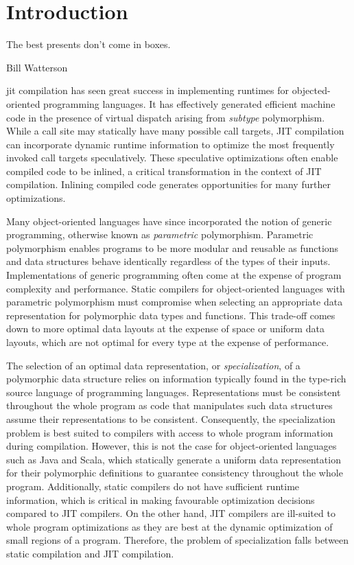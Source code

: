 \chapter{Introduction}

\epigraph{The best presents don't come in boxes.}{Bill Watterson}

\acrfull{jit} compilation has seen great success in implementing runtimes for objected-oriented programming languages.
It has effectively generated efficient machine code in the presence of virtual dispatch arising from \textit{subtype} polymorphism.
While a call site may statically have many possible call targets, JIT compilation can incorporate dynamic runtime information to optimize the most frequently invoked call targets speculatively.
These speculative optimizations often enable compiled code to be inlined, a critical transformation in the context of JIT compilation.
Inlining compiled code generates opportunities for many further optimizations.

Many object-oriented languages have since incorporated the notion of generic programming, otherwise known as \textit{parametric} polymorphism.
Parametric polymorphism enables programs to be more modular and reusable as functions and data structures behave identically\cite{tapl} regardless of the types of their inputs.
Implementations of generic programming often come at the expense of program complexity and performance.
Static compilers for object-oriented languages with parametric polymorphism must compromise when selecting an appropriate data representation for polymorphic data types and functions.
This trade-off comes down to more optimal data layouts at the expense of space or uniform data layouts, which are not optimal for every type at the expense of performance.

The selection of an optimal data representation, or \textit{specialization}, of a polymorphic data structure relies on information typically found in the type-rich source language of programming languages.
Representations must be consistent throughout the whole program as code that manipulates such data structures assume their representations to be consistent.
Consequently, the specialization problem is best suited to compilers with access to whole program information during compilation.
However, this is not the case for object-oriented languages such as Java and Scala, which statically generate a uniform data representation for their polymorphic definitions to guarantee consistency throughout the whole program. 
Additionally, static compilers do not have sufficient runtime information, which is critical in making favourable optimization decisions compared to JIT compilers.
On the other hand, JIT compilers are ill-suited to whole program optimizations as they are best at the dynamic optimization of small regions of a program.
Therefore, the problem of specialization falls between static compilation and JIT compilation.

